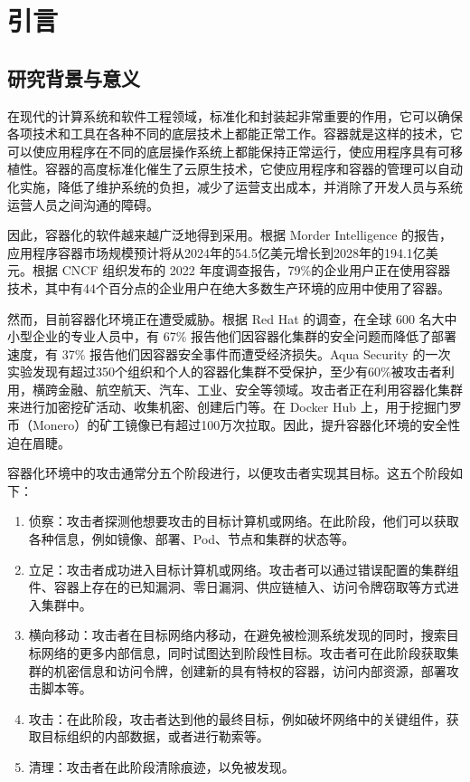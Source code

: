 \chapter{引言}{
{
\let\cleardoublepage\relax
}

\section{研究背景与意义}

在现代的计算系统和软件工程领域，标准化和封装起非常重要的作用，它可以确保各项技术和工具在各种不同的底层技术上都能正常工作。容器就是这样的技术，它可以使应用程序在不同的底层操作系统上都能保持正常运行，使应用程序具有可移植性。容器的高度标准化催生了云原生技术，它使应用程序和容器的管理可以自动化实施，降低了维护系统的负担，减少了运营支出成本，并消除了开发人员与系统运营人员之间沟通的障碍\citep{cloudnative}。

因此，容器化的软件越来越广泛地得到采用。根据 Morder Intelligence 的报告\citep{mordor2024}，应用程序容器市场规模预计将从2024年的54.5亿美元增长到2028年的194.1亿美元。根据 CNCF 组织发布的 2022 年度调查报告\citep{cncf2024}，79\%的企业用户正在使用容器技术，其中有44个百分点的企业用户在绝大多数生产环境的应用中使用了容器。

然而，目前容器化环境正在遭受威胁。根据 Red Hat 的调查\citep{redhat2023sec}，在全球 600 名大中小型企业的专业人员中，有 67\% 报告他们因容器化集群的安全问题而降低了部署速度，有 37\% 报告他们因容器安全事件而遭受经济损失。Aqua Security 的一次实验\citep{michael2024}发现有超过350个组织和个人的容器化集群不受保护，至少有60\%被攻击者利用，横跨金融、航空航天、汽车、工业、安全等领域。攻击者正在利用容器化集群来进行加密挖矿活动、收集机密、创建后门等。在 Docker Hub 上，用于挖掘门罗币（Monero）的矿工镜像已有超过100万次拉取。因此，提升容器化环境的安全性迫在眉睫。

容器化环境中的攻击通常分五个阶段进行，以便攻击者实现其目标\citep{alshamrani2019survey, armo2024}。这五个阶段如下：

\begin{enumerate}
    \item 侦察：攻击者探测他想要攻击的目标计算机或网络。在此阶段，他们可以获取各种信息，例如镜像、部署、Pod、节点和集群的状态等\citep{mitre2024}。
    \item 立足：攻击者成功进入目标计算机或网络。攻击者可以通过错误配置的集群组件、容器上存在的已知漏洞、零日漏洞、供应链植入、访问令牌窃取\citep{oshrat2024}等方式进入集群中。
    \item 横向移动：攻击者在目标网络内移动，在避免被检测系统发现的同时，搜索目标网络的更多内部信息，同时试图达到阶段性目标。攻击者可在此阶段获取集群的机密信息和访问令牌，创建新的具有特权的容器，访问内部资源，部署攻击脚本等。
    \item 攻击：在此阶段，攻击者达到他的最终目标，例如破坏网络中的关键组件，获取目标组织的内部数据，或者进行勒索等。
    \item 清理：攻击者在此阶段清除痕迹，以免被发现。
\end{enumerate}

}
